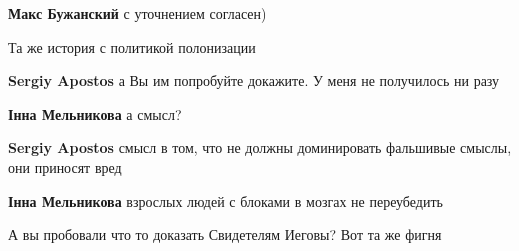\begin{itemize}
\begin{itemize}
\textbf{Макс Бужанский} с уточнением согласен)
\end{itemize}

 
Та же история с политикой полонизации

\begin{itemize}
 
\textbf{Sergiy Apostos} а Вы им попробуйте докажите. У меня не получилось ни разу

 
\textbf{Інна Мельникова} а смысл?

 
\textbf{Sergiy Apostos} смысл в том, что не должны доминировать фальшивые смыслы, они приносят вред

 
\textbf{Інна Мельникова} взрослых людей с блоками в мозгах не переубедить

 
А вы пробовали что то доказать Свидетелям Иеговы? Вот та же фигня
\end{itemize}


\end{itemize}
